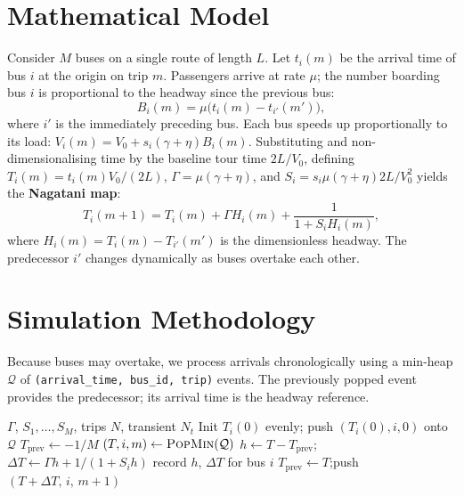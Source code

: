 \documentclass[9pt,twocolumn]{article}
\begin{document}
\section{Mathematical Model}

Consider $M$ buses on a single route of length $L$. Let $t_i(m)$ be the arrival time of bus $i$ at the origin on trip $m$. Passengers arrive at rate $\mu$; the number boarding bus $i$ is proportional to the headway since the previous bus:
\[
    B_i(m) = \mu\bigl(t_i(m)-t_{i'}(m')\bigr),
\]
where $i'$ is the immediately preceding bus. Each bus speeds up proportionally to its load: $V_i(m)=V_0+s_i(\gamma+\eta)B_i(m)$. Substituting and non-dimensionalising time by the baseline tour time $2L/V_0$, defining $T_i(m)=t_i(m)V_0/(2L)$, $\Gamma=\mu(\gamma+\eta)$, and $S_i=s_i\mu(\gamma+\eta)2L/V_0^2$ yields the \textbf{Nagatani map}:
\begin{equation}
    T_i(m+1) = T_i(m) + \Gamma H_i(m) + \frac{1}{1+S_i H_i(m)},
    \label{eq:final_map}
\end{equation}
where $H_i(m)=T_i(m)-T_{i'}(m')$ is the dimensionless headway. The predecessor $i'$ changes dynamically as buses overtake each other.

\section{Simulation Methodology}

Because buses may overtake, we process arrivals chronologically using a min-heap $\mathcal{Q}$ of \texttt{(arrival\_time, bus\_id, trip)} events. The previously popped event provides the predecessor; its arrival time is the headway reference.

\begin{algorithm}[H]
\caption{Event-driven Nagatani simulator}\label{alg:sim}
\begin{algorithmic}[1]
\footnotesize
\Require $\Gamma$, $S_1,\ldots,S_M$, trips $N$, transient $N_t$
\State Init $T_i(0)$ evenly; push $(T_i(0),i,0)$ onto $\mathcal{Q}$
\State $T_{\mathrm{prev}}\gets -1/M$ 
    \State $(T,i,m)\gets\textsc{PopMin}(\mathcal{Q})$
    \State $h\gets T-T_{\mathrm{prev}}$;\quad $\Delta T\gets\Gamma h+1/(1+S_i h)$
     record $h$, $\Delta T$ for bus $i$ \EndIf
    \State $T_{\mathrm{prev}}\gets T$;\quad push $(T+\Delta T,\,i,\,m{+}1)$
\EndWhile
\end{algorithmic}
\end{algorithm}
\end{document}
